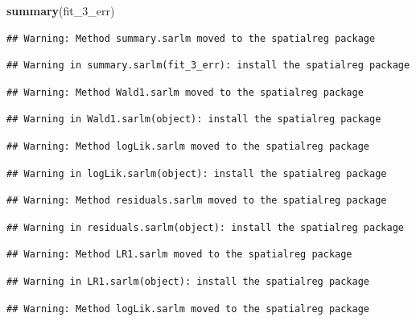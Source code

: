 \documentclass[]{book}
\newenvironment{Shaded}{\begin{snugshade}}{\end{snugshade}}
\newcommand{\DecValTok}[1]{\textcolor[rgb]{0.00,0.00,0.81}{#1}}
\newcommand{\KeywordTok}[1]{\textcolor[rgb]{0.13,0.29,0.53}{\textbf{#1}}}
\newcommand{\NormalTok}[1]{#1}
\begin{document}
\begin{Shaded}
\begin{Highlighting}[]
\KeywordTok{summary}\NormalTok{(fit_}\DecValTok{3}\NormalTok{_err)}
\end{Highlighting}
\end{Shaded}

\begin{verbatim}
## Warning: Method summary.sarlm moved to the spatialreg package
\end{verbatim}

\begin{verbatim}
## Warning in summary.sarlm(fit_3_err): install the spatialreg package
\end{verbatim}

\begin{verbatim}
## Warning: Method Wald1.sarlm moved to the spatialreg package
\end{verbatim}

\begin{verbatim}
## Warning in Wald1.sarlm(object): install the spatialreg package
\end{verbatim}

\begin{verbatim}
## Warning: Method logLik.sarlm moved to the spatialreg package
\end{verbatim}

\begin{verbatim}
## Warning in logLik.sarlm(object): install the spatialreg package
\end{verbatim}

\begin{verbatim}
## Warning: Method residuals.sarlm moved to the spatialreg package
\end{verbatim}

\begin{verbatim}
## Warning in residuals.sarlm(object): install the spatialreg package
\end{verbatim}

\begin{verbatim}
## Warning: Method LR1.sarlm moved to the spatialreg package
\end{verbatim}

\begin{verbatim}
## Warning in LR1.sarlm(object): install the spatialreg package
\end{verbatim}

\begin{verbatim}
## Warning: Method logLik.sarlm moved to the spatialreg package
\end{verbatim}
\end{document}
